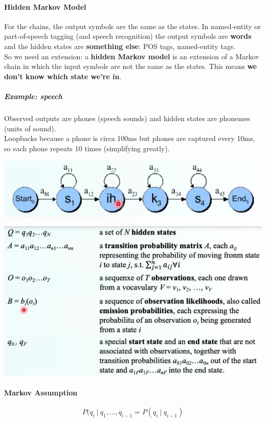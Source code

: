\documentclass[10pt]{report}
\begin{document}
\paragraph{Hidden Markov Model} For the chains, the output symbols are the same as the states. In named-entity or part-of-speech tagging (and speech recognition) the output symbols are \textbf{words} and the hidden states are \textbf{something else}: POS tags, named-entity tags.\\
So we need an extension: a \textbf{hidden Markov model} is an extension of a Markov chain in which the input symbols are not the same as the states. This means \textbf{we don't know which state we're in}.
\subparagraph{Example: speech} Observed outputs are phones (speech sounds) and hidden states are phonemes (units of sound).\\
Loopbacks because a phone is circa 100ms but phones are captured every 10ms, so each phone repeats 10 times (simplifying greatly).
\begin{center}
	\includegraphics[scale=0.5]{14.png}
\end{center}
\begin{center}
	\includegraphics[scale=0.5]{13.png} %
\end{center}
\paragraph{Markov Assumption} $$P(q_i\:|\:q_1,\ldots,q_{i-1} = P(q_i\:|\:q_{i-1})$$
\end{document}
